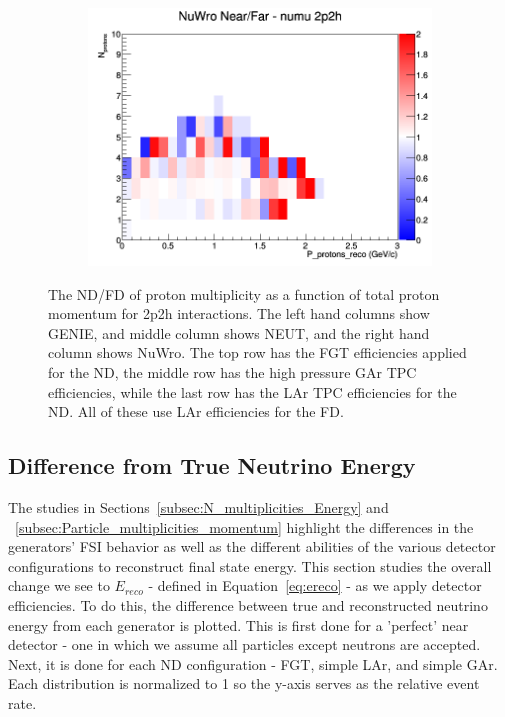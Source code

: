 \documentclass[12pt]{article}
\begin{document}
\begin{figure}[h]
\begin{subfigure}[b]{0.32\textwidth}
\includegraphics[width=\linewidth]{eff_N_P/LAr/protons/ratios/2p2h_NuWro_numu_NF_N_P.png}
\end{subfigure}
\caption{The ND/FD of proton multiplicity as a function of total proton momentum for 2p2h interactions. The left hand columns show GENIE, and middle column shows NEUT, and the right hand column shows NuWro. The top row has the FGT efficiencies applied for the ND, the middle row has the high pressure GAr TPC efficiencies, while the last row has the LAr TPC efficiencies for the ND.  All of these use LAr efficiencies for the FD.}
\label{fig:proton_multiplicity_2p2h_NF_eff}
\end{figure}


\subsection{Difference from True Neutrino Energy}
\label{subsec:EDiff}
The studies in Sections~\ref{subsec:N_multiplicities_Energy} and ~\ref{subsec:Particle_multiplicities_momentum} highlight the differences in the generators' FSI behavior as well as the different abilities of the various detector configurations to reconstruct final state energy. This section studies the overall change we see to $E_{reco}$ - defined in Equation~\ref{eq:ereco} - as we apply detector efficiencies. To do this, the difference between true and reconstructed neutrino energy from each generator is plotted. This is first done for a 'perfect' near detector - one in which we assume all particles except neutrons are accepted. Next, it is done for each ND configuration - FGT, simple LAr, and simple GAr. %
Each distribution is normalized to 1 so the y-axis serves as the relative event rate. 
\end{document}
